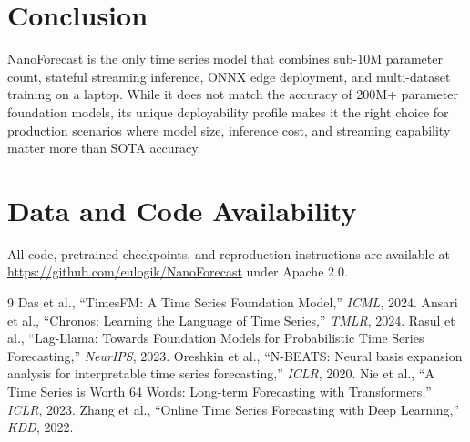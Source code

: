 \documentclass[11pt]{article}
\begin{document}
\section{Conclusion}

NanoForecast is the only time series model that combines sub-10M parameter count, stateful streaming inference, ONNX edge deployment, and multi-dataset training on a laptop. While it does not match the accuracy of 200M+ parameter foundation models, its unique deployability profile makes it the right choice for production scenarios where model size, inference cost, and streaming capability matter more than SOTA accuracy.

\section*{Data and Code Availability}
All code, pretrained checkpoints, and reproduction instructions are available at \url{https://github.com/eulogik/NanoForecast} under Apache 2.0.

\begin{thebibliography}{9}
 Das et al., ``TimesFM: A Time Series Foundation Model,'' \emph{ICML}, 2024.
 Ansari et al., ``Chronos: Learning the Language of Time Series,'' \emph{TMLR}, 2024.
 Rasul et al., ``Lag-Llama: Towards Foundation Models for Probabilistic Time Series Forecasting,'' \emph{NeurIPS}, 2023.
 Oreshkin et al., ``N-BEATS: Neural basis expansion analysis for interpretable time series forecasting,'' \emph{ICLR}, 2020.
 Nie et al., ``A Time Series is Worth 64 Words: Long-term Forecasting with Transformers,'' \emph{ICLR}, 2023.
 Zhang et al., ``Online Time Series Forecasting with Deep Learning,'' \emph{KDD}, 2022.
\end{thebibliography}
\end{document}
